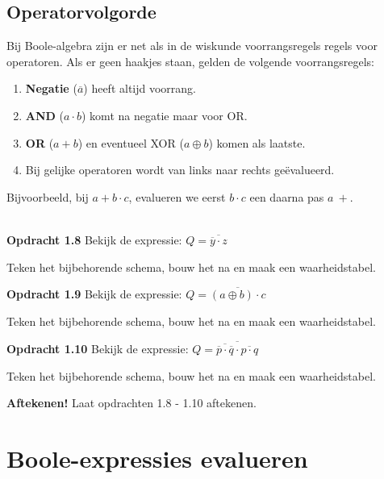 \documentclass[11pt,a5paper]{report}
\begin{document}
\subsection*{Operatorvolgorde}
Bij Boole-algebra zijn er net als in de wiskunde voorrangsregels regels voor operatoren. Als er geen haakjes staan, gelden de volgende voorrangsregels:
\begin{enumerate}
\item {\bf Negatie} ($\overline{a}$) heeft altijd voorrang.
\item {\bf AND} ($a \cdot b$) komt na negatie maar voor OR.
\item {\bf OR} ($a + b$) en eventueel XOR  ($a \oplus b$) komen als laatste.
\item Bij gelijke operatoren wordt van links naar rechts geëvalueerd.
\end{enumerate}

Bijvoorbeeld, bij  $a + b \cdot c$, evalueren we eerst $b \cdot c$ een daarna pas $a\ +$. \\ \\


\begin{framed}
\textbf{Opdracht 1.8} Bekijk de expressie: \( Q = \overline{\overline{y} \cdot z} \)

Teken het bijbehorende schema, bouw het na en maak een waarheidstabel.
\end{framed}

\begin{framed}
\textbf{Opdracht 1.9} Bekijk de expressie: \( Q = \overline{(a \oplus b) \cdot c} \)

Teken het bijbehorende schema, bouw het na en maak een waarheidstabel.
\end{framed}

\begin{framed}
\textbf{Opdracht 1.10} Bekijk de expressie: \( Q = \overline{\overline{\overline{p}\cdot \overline{q}} \cdot \overline{p \cdot q}} \)

Teken het bijbehorende schema, bouw het na en maak een waarheidstabel.
\end{framed}

\begin{framed}
\textbf{Aftekenen!} Laat opdrachten 1.8 - 1.10 aftekenen.
\end{framed}

\section*{Boole-expressies evalueren}
\end{document}
